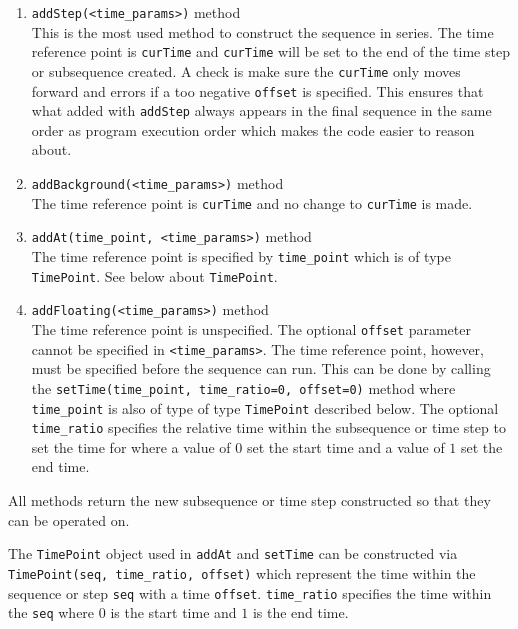 \begin{enumerate}
\item \verb`addStep(<time_params>)` method\\
  This is the most used method to construct the sequence in series.
  The time reference point is \verb`curTime` and
  \verb`curTime` will be set to the end of the time step or subsequence created.
  A check is make sure the \verb`curTime` only moves forward and
  errors if a too negative \verb`offset` is specified.
  This ensures that what added with \verb`addStep` always appears in the final
  sequence in the same order as program execution order
  which makes the code easier to reason about.
\item \verb`addBackground(<time_params>)` method\\
  The time reference point is \verb`curTime` and no change to \verb`curTime` is made.
\item \verb`addAt(time_point, <time_params>)` method\\
  The time reference point is specified by \verb`time_point` which is of type \verb`TimePoint`.
  See below about \verb`TimePoint`.
\item \verb`addFloating(<time_params>)` method\\
  The time reference point is unspecified.
  The optional \verb`offset` parameter cannot be specified in \verb`<time_params>`.
  The time reference point, however, must be specified before the sequence can run.
  This can be done by calling the \verb`setTime(time_point, time_ratio=0, offset=0)` method
  where \verb`time_point` is also of type of type \verb`TimePoint` described below.
  The optional \verb`time_ratio` specifies the relative time within the subsequence
  or time step to set the time for where a value of $0$ set the start time
  and a value of $1$ set the end time.
\end{enumerate}
All methods return the new subsequence or time step constructed
so that they can be operated on.

The \verb`TimePoint` object used in \verb`addAt` and \verb`setTime`
can be constructed via \verb`TimePoint(seq, time_ratio, offset)`
which represent the time within the sequence or step \verb`seq` with a time \verb`offset`.
\verb`time_ratio` specifies the time within the \verb`seq` where $0$ is the start time
and $1$ is the end time.

